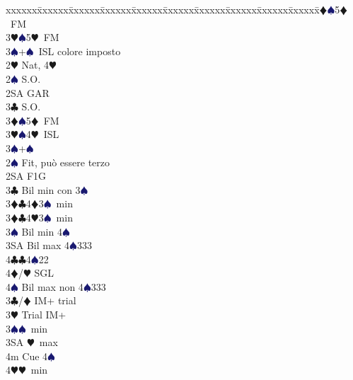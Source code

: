 \documentclass[a4paper,italian]{article}
\newcommand{\BC}{\textcolor{OliveGreen}{$\clubsuit$}}
\newcommand{\BD}{\textcolor{RedOrange}{$\vardiamondsuit$}}
\newcommand{\BH}{\textcolor{Red2}{$\varheartsuit${}}}
\newcommand{\BS}{\textcolor{MidnightBlue}{$\spadesuit${}}}
\newenvironment{bidtable}
{\begin{tabbing}

    xxxxxx\=xxxxxx\=xxxxxx\=xxxxxx\=xxxxxx\=xxxxxx\=xxxxxx\=xxxxxx\=xxxxxx\=xxxxxx\=\kill}
{\end{tabbing} }%
\begin{document}
\begin{multicols}{2}
\begin{bidtable}
                                        3\BD {}\BS 5\BD\ FM\\
                                        3\BH {}\BS 5\BH\ FM\\
                                        3\BS {}+\BS\ ISL colore imposto\-\\
                                        2\BH \> Nat, 4\BH \+\\
                                        2\BS \> S.O.\\
                                        2SA \> GAR\\
                                        3\BC \> S.O.\\
                                        3\BD {}\BS 5\BD\ FM\\
                                        3\BH {}\BS 4\BH\ ISL\\
                                        3\BS {}+\BS \-\\
                                        2\BS \> Fit, può essere terzo\+\\
                                        2SA \> F1G\+\\
                                        3\BC \> Bil min con 3\BS \\
                                        3\BD {}\BC 4\BD 3\BS\ min\\
                                        3\BD {}\BC 4\BH 3\BS\ min\\
                                        3\BS \> Bil min 4\BS \\
                                        3SA \> Bil max 4\BS 333\\
                                        4\BC {}\BC 4\BS 22\\
                                        4\BD/\BH \> SGL\\
                                        4\BS \> Bil max non 4\BS 333\-\\
                                        3\BC/\BD \> IM+ trial\\
                                        3\BH \> Trial IM+\+\\
                                        3\BS {}\BS\ min\\
                                        3SA \BH\ max\\
                                        4m \> Cue 4\BS \\
                                        4\BH {}\BH\ min\-\-\\

\end{bidtable}
\end{multicols}
\end{document}
